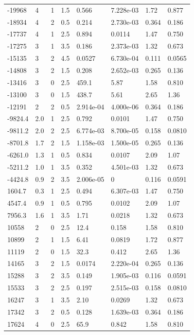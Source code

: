 \documentclass[preview]{standalone}
\begin{document}
{{\begin{tabular}{L{1.2cm}C{1.2cm} C{0.3cm}C{0.5cm} C{1.4cm}C{1.4cm} C{1.4cm}C{1.4cm}}
  -19968  &     4  & 1     & 1.5 &  0.566  & 7.228e-03  & 1.72 &  0.877   \\ 
  -18934  &     4  & 2     & 0.5 &  0.214  & 2.730e-03  & 0.364 &  0.186   \\ 
  -17737  &     4  & 1     & 2.5 &  0.894  & 0.0114  & 1.47 &  0.750   \\ 
  -17275  &     3  & 1     & 3.5 &  0.186  & 2.373e-03  & 1.32 &  0.673   \\ 
  -15135  &     3  & 2     & 4.5 &  0.0527  & 6.730e-04  & 0.111 &  0.0565   \\ 
  -14808  &     3  & 2     & 1.5 &  0.208  & 2.652e-03  & 0.265 &  0.136   \\ 
  -13416  &     3  & 0     & 2.5 &  459.1  & 5.87  & 1.58 &  0.810   \\ 
  -13100  &     3  & 0     & 1.5 &  438.7  & 5.61  & 2.65 &  1.36   \\ 
  -12191  &     2  & 2     & 0.5 &  2.914e-04  & 4.000e-06  & 0.364 &  0.186   \\ 
  -9824.4  &   2.0  & 1     & 2.5 &  0.792  & 0.0101  & 1.47 &  0.750   \\ 
  -9811.2  &   2.0  & 2     & 2.5 &  6.774e-03  & 8.700e-05  & 0.158 &  0.0810   \\ 
  -8701.8  &   1.7  & 2     & 1.5 &  1.158e-03  & 1.500e-05  & 0.265 &  0.136   \\ 
  -6261.0  &   1.3  & 1     & 0.5 &  0.834  & 0.0107  & 2.09 &  1.07   \\ 
  -5211.2  &   1.0  & 1     & 3.5 &  0.352  & 4.501e-03  & 1.32 &  0.673   \\ 
  -4424.8  &   0.9  & 2     & 3.5 &  2.006e-05  & 0  & 0.116 &  0.0591   \\ 
  1604.7  &   0.3  & 1     & 2.5 &  0.494  & 6.307e-03  & 1.47 &  0.750   \\ 
  4547.4  &   0.9  & 1     & 0.5 &  0.795  & 0.0102  & 2.09 &  1.07   \\ 
  7956.3  &   1.6  & 1     & 3.5 &  1.71  & 0.0218  & 1.32 &  0.673   \\ 
  10558  &     2  & 0     & 2.5 &  12.4  & 0.158  & 1.58 &  0.810   \\ 
  10899  &     2  & 1     & 1.5 &  6.41  & 0.0819  & 1.72 &  0.877   \\ 
  11119  &     2  & 0     & 1.5 &  32.3  & 0.412  & 2.65 &  1.36   \\ 
  14165  &     3  & 2     & 1.5 &  0.0174  & 2.220e-04  & 0.265 &  0.136   \\ 
  15288  &     3  & 2     & 3.5 &  0.149  & 1.905e-03  & 0.116 &  0.0591   \\ 
  15533  &     3  & 2     & 2.5 &  0.197  & 2.515e-03  & 0.158 &  0.0810   \\ 
  16247  &     3  & 1     & 3.5 &  2.10  & 0.0269  & 1.32 &  0.673   \\ 
  17342  &     3  & 2     & 0.5 &  0.128  & 1.639e-03  & 0.364 &  0.186   \\ 
  17624  &     4  & 0     & 2.5 &  65.9  & 0.842  & 1.58 &  0.810   \\ 
\hline 
\end{tabular} 

}}
\end{document}
